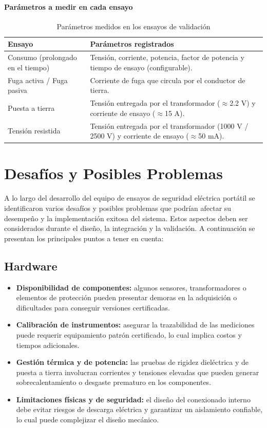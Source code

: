 \documentclass[a4paper,12pt]{article}
\begin{document}
\paragraph{Parámetros a medir en cada ensayo}
\begin{table}[H]
\centering
\begin{tabular}{|l|p{9cm}|}
\hline
\textbf{Ensayo} & \textbf{Parámetros registrados} \\ \hline
Consumo (prolongado en el tiempo) & Tensión, corriente, potencia, factor de potencia y tiempo de ensayo (configurable). \\ \hline
Fuga activa / Fuga pasiva & Corriente de fuga que circula por el conductor de tierra. \\ \hline
Puesta a tierra & Tensión entregada por el transformador ($\approx$2.2 V) y corriente de ensayo ($\approx$15 A). \\ \hline
Tensión resistida & Tensión entregada por el transformador (1000 V / 2500 V) y corriente de ensayo ($\approx$50 mA). \\ \hline
\end{tabular}
\caption{Parámetros medidos en los ensayos de validación}
\end{table}


\section{Desafíos y Posibles Problemas}

A lo largo del desarrollo del equipo de ensayos de seguridad eléctrica portátil se identificaron varios desafíos y posibles problemas que podrían afectar su desempeño y la implementación exitosa del sistema. Estos aspectos deben ser considerados durante el diseño, la integración y la validación. A continuación se presentan los principales puntos a tener en cuenta:

\subsection{Hardware}
\begin{itemize}
    \item \textbf{Disponibilidad de componentes:} algunos sensores, transformadores o elementos de protección pueden presentar demoras en la adquisición o dificultades para conseguir versiones certificadas.
    \item \textbf{Calibración de instrumentos:} asegurar la trazabilidad de las mediciones puede requerir equipamiento patrón certificado, lo cual implica costos y tiempos adicionales.
    \item \textbf{Gestión térmica y de potencia:} las pruebas de rigidez dieléctrica y de puesta a tierra involucran corrientes y tensiones elevadas que pueden generar sobrecalentamiento o desgaste prematuro en los componentes.
    \item \textbf{Limitaciones físicas y de seguridad:} el diseño del conexionado interno debe evitar riesgos de descarga eléctrica y garantizar un aislamiento confiable, lo cual puede complejizar el diseño mecánico.
\end{itemize}
\end{document}
